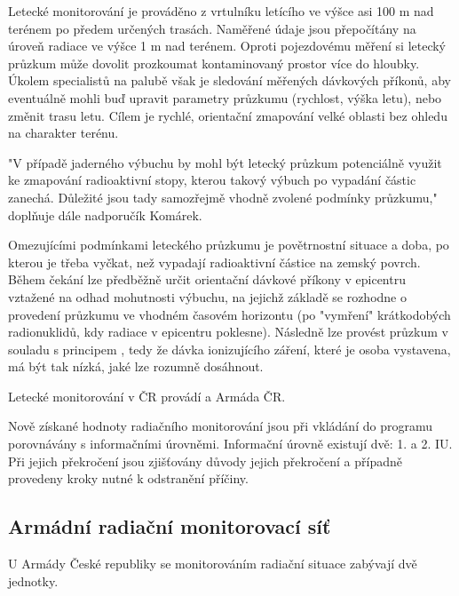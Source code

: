 \begin{itemize}
	Letecké monitorování je prováděno z vrtulníku letícího ve výšce asi 100 m nad terénem po předem určených trasách. Naměřené údaje jsou přepočítány na úroveň radiace ve výšce 1 m nad terénem. Oproti pojezdovému měření si letecký průzkum může dovolit prozkoumat kontaminovaný prostor více do hloubky. Úkolem specialistů na palubě však je sledování měřených dávkových příkonů, aby eventuálně mohli buď upravit parametry průzkumu (rychlost, výška letu), nebo změnit trasu letu. Cílem je rychlé, orientační zmapování velké oblasti bez ohledu na charakter terénu. 
	
	"V případě jaderného výbuchu by mohl být letecký průzkum potenciálně využit ke zmapování radioaktivní stopy, kterou takový výbuch po vypadání částic zanechá. Důležité jsou tady samozřejmě vhodně zvolené podmínky průzkumu," doplňuje dále nadporučík Komárek. 
	
	Omezujícími podmínkami leteckého průzkumu je povětrnostní situace a doba, po kterou je třeba vyčkat, než vypadají radioaktivní částice na zemský povrch. Během čekání lze předběžně určit orientační dávkové příkony v epicentru vztažené na odhad mohutnosti výbuchu, na jejichž základě se rozhodne o provedení průzkumu ve vhodném časovém horizontu (po "vymření" krátkodobých radionuklidů, kdy radiace v epicentru poklesne). Následně lze provést průzkum v souladu s principem , tedy že dávka ionizujícího záření, které je osoba vystavena, má být tak nízká, jaké lze rozumně dosáhnout.
	
	Letecké monitorování v ČR provádí  a Armáda ČR. 

\end{itemize}
	
	Nově získané hodnoty radiačního monitorování jsou při vkládání do programu  porovnávány s informačními úrovněmi. Informační úrovně existují dvě: 1. a 2. IU. Při jejich překročení jsou zjišťovány důvody jejich překročení a případně provedeny kroky nutné k odstranění příčiny.
	
\subsection{Armádní radiační monitorovací síť}	
	
	
	U Armády České republiky se monitorováním radiační situace zabývají dvě jednotky. 
	 
